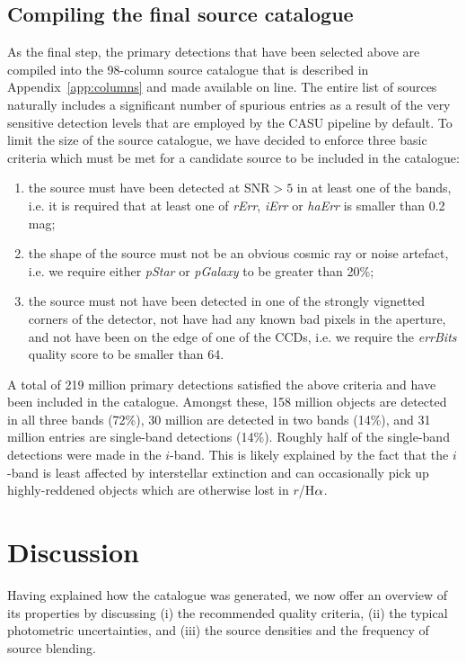 \documentclass[useAMS,usenatbib]{mn2e}
\def\ha{\mbox{H$\rm \alpha$}}
\begin{document}
\subsection{Compiling the final source catalogue}

As the final step, the primary detections that have been
selected above are compiled
into the 98-column source catalogue
that is described in Appendix~\ref{app:columns}
and made available on line.
The entire list of sources naturally includes 
a significant number of spurious entries
as a result of the very sensitive detection levels
that are employed by the CASU pipeline by default.
To limit the size of the source catalogue,
we have decided to enforce three basic criteria
which must be met for a candidate source
to be included in the catalogue:
\begin{enumerate}
\item the source must have been detected at SNR$>5$ in at least
one of the bands, i.e. it is required that at least one of
\emph{rErr}, \emph{iErr} or \emph{haErr} is smaller
than 0.2 mag;
\item the shape of the source must not be an obvious
cosmic ray or noise artefact, i.e. we require
either \emph{pStar} or \emph{pGalaxy} to be
greater than 20\%;
\item the source must not have been detected in one of the strongly
vignetted corners of the detector, 
not have had any known bad pixels in the aperture,
and not have been on the edge of one of the CCDs,
i.e. we require the \emph{errBits} quality score
to be smaller than 64.
\end{enumerate}

A total of 219 million primary detections satisfied
the above criteria and have been included in the catalogue.
Amongst these, 158 million objects 
are detected in all three bands (72\%),
30 million are detected in two bands (14\%),
and 31 million entries are single-band detections (14\%).
Roughly half of the single-band detections were made in the $i$-band.
This is likely explained by the fact that the $i$-band is least
affected by interstellar extinction and can occasionally pick up
highly-reddened objects which are otherwise lost in $r$/\ha.

\section{Discussion}
\label{sec:discussion}

Having explained how the catalogue was generated,
we now offer an overview of its properties
by discussing  
(i) the recommended quality criteria,
(ii) the typical photometric uncertainties,
and (iii) the source densities and the frequency of source blending.
\end{document}
